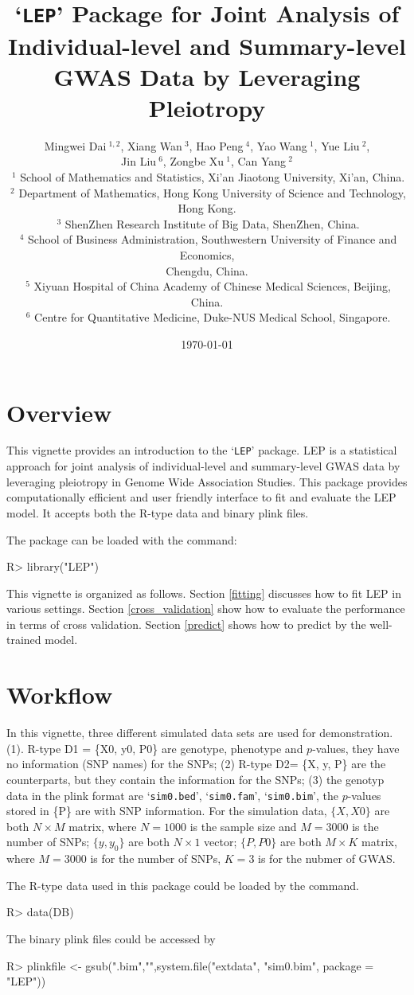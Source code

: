 \documentclass[11pt]{article}
\title{`\texttt{LEP}' Package for Joint Analysis of Individual-level and Summary-level GWAS Data by Leveraging Pleiotropy}
\author{Mingwei Dai$~^{1,2}$, Xiang Wan$~^3$, Hao Peng$~^4$, Yao Wang$~^1$, Yue Liu$~^2$, \\ Jin Liu$~^6$, Zongbe Xu$~^1$, Can Yang$~^2$\\
$~^1$ School of Mathematics and Statistics, Xi'an Jiaotong University, Xi'an, China.\\
$~^2$ Department of Mathematics, Hong Kong University of Science and Technology, Hong Kong.\\
$~^3$ ShenZhen Research Institute of Big Data, ShenZhen, China.\\
$~^4$ School of Business Administration, Southwestern University of Finance and Economics,\\ Chengdu, China.\\
$~^5$ Xiyuan Hospital of China Academy of Chinese Medical Sciences, Beijing, China.\\
$~^6$ Centre for Quantitative Medicine, Duke-NUS Medical School, Singapore.\\
}
\date{\today}
\begin{document}

\maketitle
\section{Overview}

This vignette provides an introduction to the `\texttt{LEP}' package.
LEP is a statistical approach for joint analysis of individual-level and summary-level GWAS data by leveraging pleiotropy in Genome Wide Association Studies. This package provides computationally efficient and user friendly interface to fit and evaluate the LEP model. It accepts both the R-type data and binary plink files.

The package can be loaded with the command:


\begin{Schunk}
\begin{Sinput}
R> library("LEP")
\end{Sinput}
\end{Schunk}

This vignette is organized as follows.
Section \ref{fitting} discusses how to fit LEP in various settings.
Section \ref{cross_validation} show how to evaluate the performance in terms of cross validation. Section \ref{predict} shows how to predict by the well-trained model.


\section{Workflow}\label{workflow}

In this vignette, three different simulated data sets are used for demonstration. (1). R-type D1 = \{X0, y0, P0\} are genotype, phenotype and $p$-values, they have no information (SNP names) for the SNPs; (2) R-type D2= \{X, y, P\} are the counterparts, but they contain the information for the SNPs; (3) the genotyp data in the plink format are `\texttt{sim0.bed}', `\texttt{sim0.fam}', `\texttt{sim0.bim}', the $p$-values stored in \{P\} are with SNP information. For the simulation data, $\{X, X0\}$ are both $N \times M$ matrix, where $N=1000$ is the sample size and $M=3000$ is the number of SNPs; $\{y, y_0\}$ are both $N \times 1$ vector; $\{P, P0\}$ are both $M \times K$ matrix, where $M=3000$ is for the number of SNPs, $K=3$ is for the nubmer of GWAS.


The R-type data used in this package could be loaded by the command.
\begin{Schunk}
\begin{Sinput}
R> data(DB)
\end{Sinput}
\end{Schunk}
The binary plink files could be accessed by
\begin{Schunk}
\begin{Sinput}
R> plinkfile <- gsub(".bim","",system.file("extdata", "sim0.bim", package = "LEP"))
\end{Sinput}
\end{Schunk}
\end{document}
